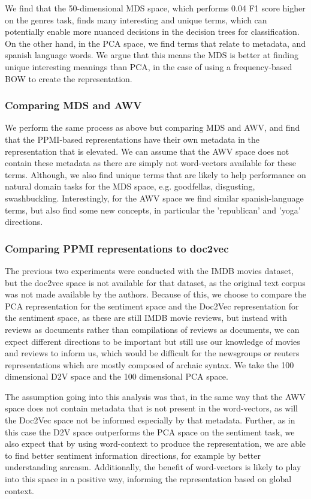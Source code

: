 We find that the 50-dimensional MDS space, which performs 0.04 F1 score higher on the genres task, finds many interesting and unique terms, which can potentially enable more nuanced decisions in the decision trees for classification. On the other hand, in the PCA space, we find terms that relate to metadata, and spanish language words. We argue that this means the MDS is better at finding unique interesting meanings than PCA, in the case of using a frequency-based BOW to create the representation.

\subsubsection{Comparing MDS and AWV}

We perform the same process as above but comparing MDS and AWV, and find that the PPMI-based representations have their own metadata in the representation that is elevated. We can assume that the AWV space does not contain these metadata as there are simply not word-vectors available for these terms. Although, we also find unique terms that are likely to help performance on natural domain tasks for the MDS space, e.g. goodfellas, disgusting, swashbuckling. Interestingly, for the AWV space we find similar spanish-language terms, but also find some new concepts, in particular the 'republican' and 'yoga' directions.

\subsubsection{Comparing PPMI representations to doc2vec}

The previous two experiments were conducted with the IMDB movies dataset, but the doc2vec space is not available for that dataset, as the original text corpus was not made available by the authors. Because of this, we choose to compare the PCA representation for the sentiment space and the Doc2Vec representation for the sentiment space, as these are still IMDB movie reviews, but instead with reviews as documents rather than compilations of reviews as documents, we can expect different directions to be important but still use our knowledge of movies and reviews to inform us, which would be difficult for the newsgroups or reuters representations which are mostly composed of archaic syntax. We take the 100 dimensional D2V space and the 100 dimensional PCA space. 

The assumption going into this analysis was that, in the same way that the AWV space does not contain metadata that is not present in the word-vectors, as will the Doc2Vec space not be informed especially by that metadata. Further, as in this case the D2V space outperforms the PCA space on the sentiment task, we also expect that by using word-context to produce the representation, we are able to find better sentiment information directions, for example by better understanding sarcasm. Additionally, the benefit of word-vectors is likely to play into this space in a positive way, informing the representation based on global context. 

